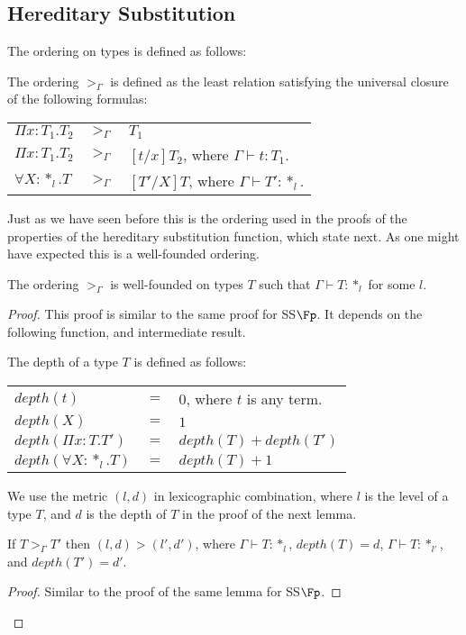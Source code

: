 \subsection{Hereditary Substitution}
\label{sec:the_hereditary_substitution_function_ssfe}
The ordering on types is defined as follows:
\begin{definition}
  The ordering $>_\Gamma$ is defined as the least relation satisfying the universal closure
  of the following formulas:
  \begin{center}
    \begin{tabular}{lll}
      $\Pi x:T_1.T_2$ & $>_\Gamma$ & $T_1$\\
      $\Pi x:T_1.T_2$ & $>_{\Gamma}$ & $[t/x]T_2$, where $\Gamma \vdash t:T_1$.\\
      $\forall X:*_l.T$  & $>_\Gamma$ & $[T'/X]T$, where $\Gamma \vdash T':*_l$.\\
    \end{tabular}
  \end{center}
  \label{def:ordering_ssfe}
\end{definition}
Just as we have seen before this is the ordering used in the proofs of
the properties of the hereditary substitution function, which state
next.  As one might have expected this is a well-founded ordering.
\begin{thm}
  The ordering $>_\Gamma$ is well-founded on types $T$ such that 
  $\Gamma \vdash T:*_l$ for some $l$.
  \label{thm:well-founded_ordering_ssfe}
\end{thm}
\begin{proof}
  This proof is similar to the same proof for SS$\Fp$.  It depends on
  the following function, and intermediate result.
  \begin{definition}
  The depth of a type $T$ is defined as follows:
  \begin{center}
    \begin{tabular}{lll}
      $depth(t)$                  & $=$ & $0$, where $t$ is any term.\\
      $depth(X)$                  & $=$ & $1$\\
      $depth(\Pi x:T.T')$   & $=$ & $depth(T) + depth(T')$\\
      $depth(\forall X:*_l.T)$ & $=$ & $depth(T) + 1$\\
    \end{tabular}
  \end{center}
\end{definition}
\noindent
We use the metric $(l,d)$ in lexicographic combination, where $l$ is the level of
a type $T$, and $d$ is the depth of $T$ in the proof of the next lemma.  

\begin{lemma}
  \label{lemma:well-founded_measure_ssfe}
  If $T >_\Gamma T'$ then $(l,d) > (l',d')$, where $\Gamma \vdash T:*_l$, 
  $depth(T) = d$,  $\Gamma \vdash T:*_{l'}$, and $depth(T') = d'$.
\end{lemma}
\begin{proof}
  Similar to the proof of the same lemma for SS$\Fp$. 
\end{proof}
\end{proof}

